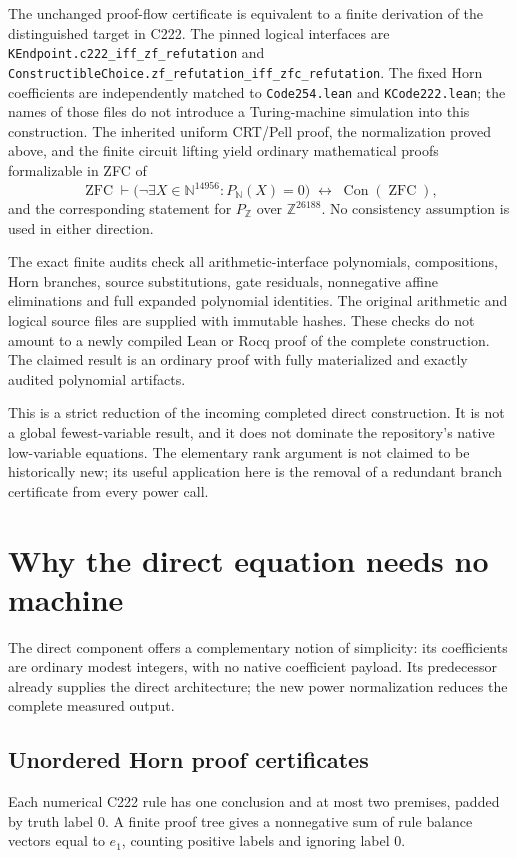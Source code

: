 \documentclass[11pt,letterpaper]{article}
\theoremstyle{remark}\newtheorem{remark}[theorem]{Remark}
\begin{document}
The unchanged proof-flow certificate is equivalent to a finite derivation of
the distinguished target in C222. The pinned logical interfaces are
\texttt{KEndpoint.c222\_iff\_zf\_refutation} and
\texttt{ConstructibleChoice.zf\_refutation\_iff\_zfc\_refutation}.
The fixed Horn coefficients are independently matched to
\texttt{Code254.lean} and \texttt{KCode222.lean}; the names of those files
do not introduce a Turing-machine simulation into this construction.
The inherited uniform CRT/Pell proof, the normalization proved above, and
the finite circuit lifting yield ordinary mathematical proofs formalizable
in ZFC of
\[
 \operatorname{ZFC}\vdash
 \bigl(\neg\exists X\in\mathbb N^{14956}:P_{\mathbb N}(X)=0\bigr)
 \;\longleftrightarrow\;\operatorname{Con}(\operatorname{ZFC}),
\]
and the corresponding statement for $P_{\mathbb Z}$ over
$\mathbb Z^{26188}$. No consistency assumption is used in either direction.

The exact finite audits check all arithmetic-interface polynomials,
compositions, Horn branches, source substitutions, gate residuals,
nonnegative affine eliminations and full expanded polynomial identities.
The original arithmetic and logical source files are supplied with immutable
hashes. These checks do not amount to a newly compiled Lean or Rocq proof of
the complete construction. The claimed result is an ordinary proof with
fully materialized and exactly audited polynomial artifacts.

This is a strict reduction of the incoming completed direct construction.
It is not a global fewest-variable result, and it does not dominate the
repository's native low-variable equations. The elementary rank argument is
not claimed to be historically new; its useful application here is the
removal of a redundant branch certificate from every power call.


\section{Why the direct equation needs no machine}
\label{sec:directflow}
The direct component offers a complementary notion of simplicity: its
coefficients are ordinary modest integers, with no native coefficient
payload. Its predecessor already supplies the direct architecture; the new
power normalization reduces the complete measured output.

\subsection{Unordered Horn proof certificates}
Each numerical C222 rule has one conclusion and at most two premises,
padded by truth label $0$. A finite proof tree gives a nonnegative sum of
rule balance vectors equal to $e_1$, counting positive labels and ignoring
label $0$.
\end{document}
